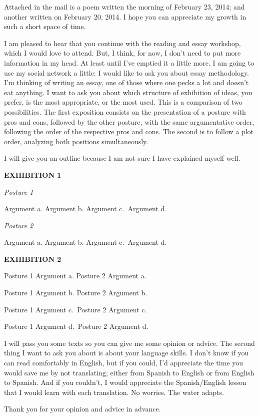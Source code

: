 \documentclass[]{book}
\begin{document}
Attached in the mail is a poem written the morning of February 23, 2014; and another written on February 20, 2014. I hope you can appreciate my growth in such a short space of time.

I am pleased to hear that you continue with the reading and essay workshop, which I would love to attend. But, I think, for now, I don't need to put more information in my head. At least until I've emptied it a little more. I am going to use my social network a little: I would like to ask you about essay methodology. I'm thinking of writing an essay, one of those where one pecks a lot and doesn't eat anything. I want to ask you about which structure of exhibition of ideas, you prefer, is the most appropriate, or the most used. This is a comparison of two possibilities. The first exposition consists on the presentation of a posture with pros and cons, followed by the other posture, with the same argumentative order, following the order of the respective pros and cons. The second is to follow a plot order, analyzing both positions simultaneously.

I will give you an outline because I am not sure I have explained myself well.

\textbf{EXHIBITION 1}

\emph{Posture 1}

Argument a. Argument b. Argument c.~Argument d.

\emph{Posture 2}

Argument a. Argument b. Argument c.~Argument d.~

\textbf{EXHIBITION 2}

Posture 1 Argument a. Posture 2 Argument a.

Posture 1 Argument b. Posture 2 Argument b.

Posture 1 Argument c.~Posture 2 Argument c.

Posture 1 Argument d.~Posture 2 Argument d.

I will pass you some texts so you can give me some opinion or advice. The second thing I want to ask you about is about your language skills. I don't know if you can read comfortably in English, but if you could, I'd appreciate the time you would save me by not translating; either from Spanish to English or from English to Spanish. And if you couldn't, I would appreciate the Spanish/English lesson that I would learn with each translation. No worries. The water adapts.

Thank you for your opinion and advice in advance.
\end{document}
